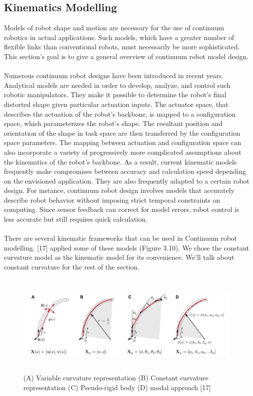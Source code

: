 \documentclass[12pt,twoside,a4]{mwbk}
\begin{document}
\subsection{Kinematics Modelling}
Models of robot shape and motion are necessary for the use of continuum robotics in actual applications. Such models, which have a greater number of flexible links than conventional robots, must necessarily be more sophisticated. This section's goal is to give a general overview of continuum robot model design.
\\ \\
Numerous continuum robot designs have been introduced in recent years. Analytical models are needed in order to develop, analyze, and control such robotic manipulators. They make it possible to determine the robot's final distorted shape given particular actuation inputs. The actuator space, that describes the actuation of the robot's backbone, is mapped to a configuration space, which parameterizes the robot's shape. The resultant position and orientation of the shape in task space are then transferred by the configuration space parameters. The mapping between actuation and configuration space can also incorporate a variety of progressively more complicated assumptions about the kinematics of the robot's backbone. As a result, current kinematic models frequently make compromises between accuracy and calculation speed depending on the envisioned application. They are also frequently adapted to a certain robot design. For instance, continuum robot design involves models that accurately describe robot behavior without imposing strict temporal constraints on computing. Since sensor feedback can correct for model errors, robot control is less accurate but still requires quick calculation.
\\ \\
There are several kinematic frameworks that can be used in Continuum robot modelling. [17] applied some of these models (Figure 3.10). We chose the constant curvature model as the kinematic model for its convenience. We'll talk about constant curvature for the rest of the section.
\begin{figure}[h]
    \centering
    \includegraphics[width=16.25cm, height=5.0cm]{models.JPG}
    \caption{(A) Variable curvature representation (B) Constant curvature representation (C) Pseudo-rigid body  (D) modal approach [17]}
\end{figure}
\end{document}
